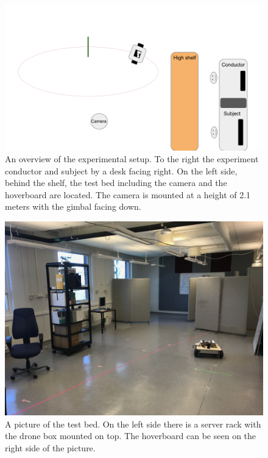 \documentclass[nofilelist]{cslthse-msc}
\begin{document}
\begin{figure}[!hbt]
   \centering
   \includegraphics[scale=0.3]{images/exp-setup.png} 
   \caption{An overview of the experimental setup. To the right the experiment conductor and subject by a desk facing right. On the left side, behind the shelf, the test bed including the camera and the hoverboard are located. The camera is mounted at a height of 2.1 meters with the gimbal facing down.}
   \label{fig:exp-setup}
\end{figure}


\begin{figure}[!hbt]
   \centering
   \includegraphics[scale=0.1]{images/testbed.jpg} 
   \caption{A picture of the test bed. On the left side there is a server rack with the drone box mounted on top. The hoverboard can be seen on the right side of the picture.}
   \label{fig:real-exp}
\end{figure}
\end{document}
